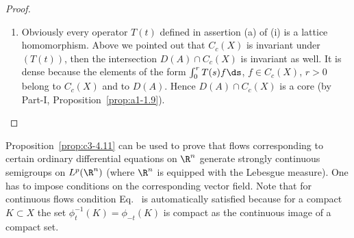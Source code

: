 \begin{proof}
\begin{enumerate}[\upshape (i), wide, labelindent=.25em, start=2]
\item
Obviously every operator $T(t)$ defined in assertion (a) of (i)
is a lattice homomorphism. Above we pointed out that $C_c(X)$ is
invariant under $(T(t))$, then the intersection $D(A) \cap C_c(X)$ is invariant as well. It
is dense because the elements of the form $\int_{0}^{r} T(s)f \ds$, $f \in C_c(X)$,
$r > 0$ belong to $C_c(X)$ and to $D(A)$. Hence $D(A) \cap C_c(X)$ is a core%
(by Part-I, Proposition~\ref{prop:a1-1.9}).
\end{enumerate}

\end{proof}
Proposition~\ref{prop:c3-4.11} can be used to prove that flows corresponding to certain
ordinary differential equations on $\R ^n$ generate strongly continuous
semigroups on $L^p(\R ^n)$ (where $\R ^n$ is equipped with the Lebesgue
measure). One has to impose conditions on the corresponding vector
field. Note that for continuous flows condition Eq.~ is automatically satisfied because for a compact $K \subset X$ the set $\phi_t^{-1}(K) = \phi_{-t}(K)$
is compact as the continuous image of a compact set.

